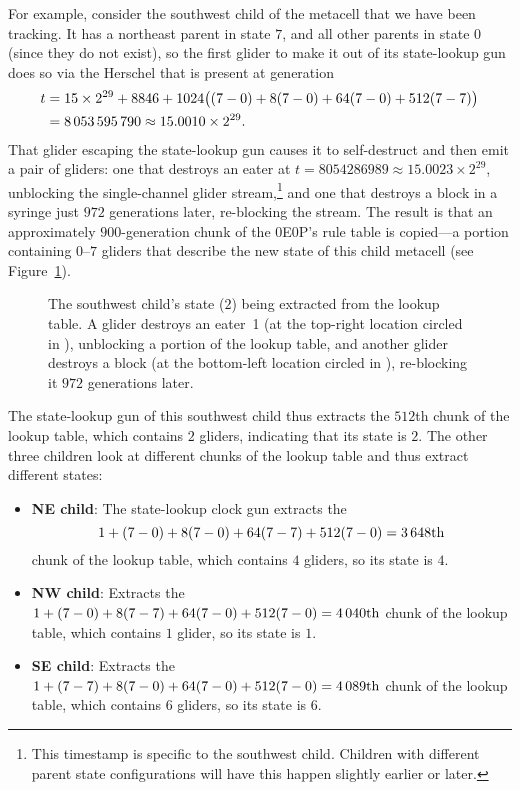 For example, consider the southwest child of the metacell that we have been tracking. It has a northeast parent in state $7$, and all other parents in state $0$ (since they do not exist), so the first glider to make it out of its state-lookup gun does so via the Herschel that is present at generation
\begin{align*}
	t & = 15 \times 2^{29} + 8846 + 1024\big((7-0) + 8(7-0) + 64(7-0) + 512(7-7)\big) \\
	& = 8{\,}053{\,}595{\,}790 \approx 15.0010 \times 2^{29}.
\end{align*}
That glider escaping the state-lookup gun causes it to self-destruct and then emit a pair of gliders: one that destroys an eater at $t = 8054286989 \approx 15.0023 \times 2^{29}$, unblocking the single-channel glider stream,\footnote{This timestamp is specific to the southwest child. Children with different parent state configurations will have this happen slightly earlier or later.} and one that destroys a block in a syringe just $972$ generations later, re-blocking the stream. The result is that an approximately $900$-generation chunk of the 0E0P's rule table is copied---a portion containing $0$--$7$ gliders that describe the new state of this child metacell (see Figure~\ref{fig:0e0p_timeline_8054286989}).

\begin{figure}[!htb]
	\centering
	\caption{The southwest child's state ($2$) being extracted from the lookup table. A glider destroys an eater~1 (at the top-right location circled in ), unblocking a portion of the lookup table, and another glider destroys a block (at the bottom-left location circled in ), re-blocking it $972$ generations later.}
	\label{fig:0e0p_timeline_8054286989}
\end{figure}

The state-lookup gun of this southwest child thus extracts the $512$th chunk of the lookup table, which contains $2$ gliders, indicating that its state is $2$. The other three children look at different chunks of the lookup table and thus extract different states:\smallskip

\begin{itemize}
	\item \textbf{NE child}: The state-lookup clock gun extracts the
	\[
		1 + (7-0) + 8(7-0) + 64(7-7) + 512(7-0) = 3{\,}648\text{th}
	\]
	chunk of the lookup table, which contains $4$ gliders, so its state is $4$.\smallskip
	
	\item \textbf{NW child}: Extracts the $1 + (7-0) + 8(7-7) + 64(7-0) + 512(7-0) = 4{\,}040\text{th}$ chunk of the lookup table, which contains $1$ glider, so its state is $1$.\smallskip
	
	\item \textbf{SE child}: Extracts the $1 + (7-7) + 8(7-0) + 64(7-0) + 512(7-0) = 4{\,}089\text{th}$ chunk of the lookup table, which contains $6$ gliders, so its state is $6$.\smallskip
\end{itemize}

